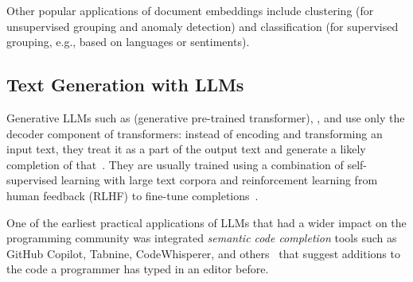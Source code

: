 Other popular applications of document embeddings include clustering (for unsupervised grouping and anomaly detection) and classification (for supervised grouping, e.g., based on languages or sentiments).

\subsection*{Text Generation with LLMs}
\label{sec:background/semtec/generation}

Generative LLMs such as  (generative pre-trained transformer), , and  use only the decoder component of transformers:
instead of encoding and transforming an input text, they treat it as a part of the output text and generate a likely completion of that~\cite{radford2018improving,openai2024gpt4}.
They are usually trained using a combination of self-supervised learning with large text corpora and reinforcement learning from human feedback (RLHF) to fine-tune completions~\cite{ouyang2022training}.

One of the earliest practical applications of LLMs that had a wider impact on the programming community was integrated \emph{semantic code completion} tools such as GitHub Copilot, Tabnine, CodeWhisperer, and others~\cite{chen2021evaluating,barka2023grounded} that suggest additions to the code a programmer has typed in an editor before.

